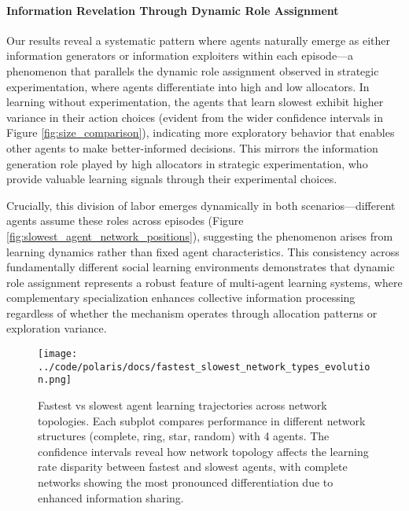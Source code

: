 \paragraph{Information Revelation Through Dynamic Role Assignment} Our results reveal a systematic pattern where agents naturally emerge as either information generators or information exploiters within each episode—a phenomenon that parallels the dynamic role assignment observed in strategic experimentation, where agents differentiate into high and low allocators. In learning without experimentation, the agents that learn slowest exhibit higher variance in their action choices (evident from the wider confidence intervals in Figure \ref{fig:size_comparison}), indicating more exploratory behavior that enables other agents to make better-informed decisions. This mirrors the information generation role played by high allocators in strategic experimentation, who provide valuable learning signals through their experimental choices.

Crucially, this division of labor emerges dynamically in both scenarios—different agents assume these roles across episodes (Figure \ref{fig:slowest_agent_network_positions}), suggesting the phenomenon arises from learning dynamics rather than fixed agent characteristics. This consistency across fundamentally different social learning environments demonstrates that dynamic role assignment represents a robust feature of multi-agent learning systems, where complementary specialization enhances collective information processing regardless of whether the mechanism operates through allocation patterns or exploration variance.

\begin{figure}[!htbp]
    \centering
    \texttt{[image: ../code/polaris/docs/fastest\_slowest\_network\_types\_evolution.png]}
    \caption{Fastest vs slowest agent learning trajectories across network topologies. Each subplot compares performance in different network structures (complete, ring, star, random) with 4 agents. The confidence intervals reveal how network topology affects the learning rate disparity between fastest and slowest agents, with complete networks showing the most pronounced differentiation due to enhanced information sharing.}
    \label{fig:type_comparison}
\end{figure}

